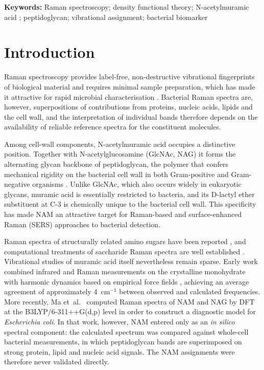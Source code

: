 \documentclass[11pt,a4paper]{article}
\newcommand{\wn}{\ensuremath{\mathrm{cm}^{-1}}}
\begin{document}
\vspace{1em}\noindent\textbf{Keywords:} 
Raman spectroscopy; density functional theory; N-acetylmuramic acid ;
peptidoglycan; vibrational assignment; bacterial biomarker
\vspace{1em}





\section{Introduction}

Raman spectroscopy provides label-free, non-destructive vibrational
fingerprints of biological material and requires minimal sample preparation,
which has made it attractive for rapid microbial characterisation
\cite{wang2022bacteria,ma2024ecoli}. Bacterial Raman spectra are, however,
superpositions of contributions from proteins, nucleic acids, lipids and the
cell wall, and the interpretation of individual bands therefore depends on the
availability of reliable reference spectra for the constituent molecules.

Among cell-wall components, N-acetylmuramic acid occupies a distinctive
position. Together with N-acetylglucosamine (GlcNAc, NAG) it forms the
alternating glycan backbone of peptidoglycan, the polymer that confers
mechanical rigidity on the bacterial cell wall in both Gram-positive and
Gram-negative organisms \cite{vollmer2008}. Unlike GlcNAc, which also occurs widely in
eukaryotic glycans, muramic acid is essentially restricted to bacteria, and
its D-lactyl ether substituent at C-3 is chemically unique to the bacterial
cell wall. This specificity has made NAM an attractive target for
Raman-based and surface-enhanced Raman (SERS) approaches to bacterial
detection.

Raman spectra of structurally related amino sugars have been reported
\cite{she1974raman}, and computational treatments of saccharide Raman spectra
are well established \cite{kaminsky2020saccharides}.
Vibrational studies of muramic acid itself nevertheless remain sparse. Early work
combined infrared and Raman measurements on the crystalline monohydrate with
harmonic dynamics based on empirical force fields \cite{kouach1994}, achieving
an average agreement of approximately 4~\wn{} between observed and calculated
frequencies. More recently, Ma et~al.\ \cite{ma2024ecoli} computed Raman
spectra of NAM and NAG by DFT at the B3LYP/6-311++G(d,p) level in order to
construct a diagnostic model for \emph{Escherichia coli}. In that work,
however, NAM entered only as an \emph{in silico} spectral component: the
calculated spectrum was compared against whole-cell bacterial measurements,
in which peptidoglycan bands are superimposed on strong protein, lipid and
nucleic acid signals. The NAM assignments were therefore never validated
directly.
\end{document}
